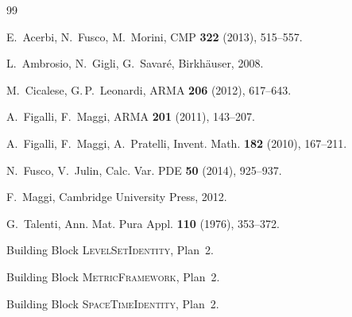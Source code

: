 \documentclass[11pt]{article}
\theoremstyle{definition}
\begin{document}
\begin{thebibliography}{99}

E.~Acerbi, N.~Fusco, M.~Morini, CMP \textbf{322} (2013), 515--557.

L.~Ambrosio, N.~Gigli, G.~Savar\'e, Birkh\"auser, 2008.

M.~Cicalese, G.\,P.~Leonardi, ARMA \textbf{206} (2012), 617--643.

A.~Figalli, F.~Maggi, ARMA \textbf{201} (2011), 143--207.

A.~Figalli, F.~Maggi, A.~Pratelli, Invent. Math. \textbf{182} (2010), 167--211.

N.~Fusco, V.~Julin, Calc. Var. PDE \textbf{50} (2014), 925--937.

F.~Maggi, Cambridge University Press, 2012.

G.~Talenti, Ann. Mat. Pura Appl. \textbf{110} (1976), 353--372.

Building Block \textsc{LevelSetIdentity}, Plan~2.

Building Block \textsc{MetricFramework}, Plan~2.

Building Block \textsc{SpaceTimeIdentity}, Plan~2.

\end{thebibliography}
\end{document}
